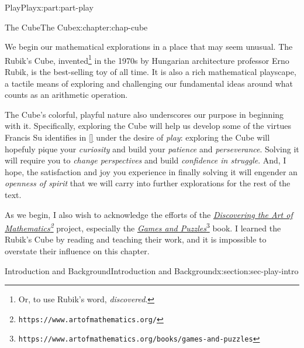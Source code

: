 \documentclass[oneside,10pt,]{book}
\newcommand{\xreffont}{\relax}
\numberwithin{equation}{section}
\begin{document}
\begin{partptx}{Play}{}{Play}{}{}{x:part:part-play}
%
\typeout{************************************************}
\typeout{************************************************}
%
\begin{chapterptx}{The Cube}{}{The Cube}{}{}{x:chapter:chap-cube}
\begin{introduction}{}%
We begin our mathematical explorations in a place that may seem unusual. The Rubik's Cube, invented\footnote{Or, to use Rubik's word, \emph{discovered}.\label{g:fn:idp105544742198160}} in the 1970s by Hungarian architecture professor Erno Rubik, is the best-selling toy of all time. It is also a rich mathematical playscape, a tactile means of exploring and challenging our fundamental ideas around what counts as an arithmetic operation.%
\par
The Cube's colorful, playful nature also underscores our purpose in beginning with it. Specifically, exploring the Cube will help us develop some of the virtues Francis Su identifies in \hyperlink{x:biblio:Su2020}{[{\xreffont 1}]} under the desire of \emph{play}: exploring the Cube will hopefuly pique your \emph{curiosity} and build your \emph{patience} and \emph{perseverance}. Solving it will require you to \emph{change perspectives} and build \emph{confidence in struggle}. And, I hope, the satisfaction and joy you experience in finally solving it will engender an \emph{openness of spirit} that we will carry into further explorations for the rest of the text.%
\par
As we begin, I also wish to acknowledge the efforts of the \emph{\href{https://www.artofmathematics.org/}{Discovering the Art of Mathematics}\footnote{\nolinkurl{https://www.artofmathematics.org/}\label{g:fn:idp105544742203024}}} project, especially the \href{https://www.artofmathematics.org/books/games-and-puzzles}{\emph{Games and Puzzles}}\footnote{\nolinkurl{https://www.artofmathematics.org/books/games-and-puzzles}\label{g:fn:idp105544742203920}} book. I learned the Rubik's Cube by reading and teaching their work, and it is impossible to overstate their influence on this chapter.%
\end{introduction}%
%
%
\typeout{************************************************}
\typeout{************************************************}
%
\begin{sectionptx}{Introduction and Background}{}{Introduction and Background}{}{}{x:section:sec-play-intro}
\begin{introduction}{}%

\end{introduction}
\end{sectionptx}
\end{chapterptx}
\end{partptx}
\end{document}
